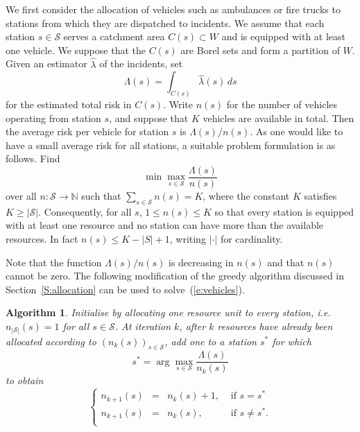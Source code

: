 \documentclass[twoside,11pt]{article}
\newtheorem{algorithm}{Algorithm}[section]
\begin{document}
We first consider the allocation of vehicles such as ambulances or
fire trucks to stations from which they are dispatched to incidents. We 
assume that each station $s \in \mathcal{S}$ serves a catchment area 
$C(s) \subset W$ and is equipped with at least one vehicle.
We suppose that the $C(s)$ are Borel sets and form a partition 
of $W$. Given an estimator $\widehat \lambda$ of the incidents, set
\[
\Lambda(s) = \int_{C(s)} \widehat \lambda(s) \, ds
\]
for the estimated total risk in $C(s)$. Write $n(s)$ for the number 
of vehicles operating from station $s$, and suppose that $K$ vehicles 
are available in total. Then the average risk per vehicle for station 
$s$ is ${\Lambda(s)}/{n(s)}$. As one would like to have a small average 
risk for all stations, a suitable problem formulation is as follows. Find 
\begin{equation}
\min\max_{s \in \mathcal{S}} \frac{\Lambda(s)}{n(s)}
\label{e:vehicles}
\end{equation}over all $n: \mathcal{S} \to \mathbb{N}$ such that 
$\sum_{s\in\mathcal{S}} n(s) = K$, where the constant
$K$ satisfies $K \geq |\mathcal{S}|$.  Consequently, for all $s$,
$1\leq n(s) \leq K$ so that every station is equipped with
at least one resource and no station can have more than the
available resources. In fact $n(s) \leq K - |S| + 1$, writing
$|\cdot|$ for cardinality.

Note that the function $\Lambda(s)/n(s)$ is decreasing in
$n(s)$ and that $n(s)$ cannot be zero. The following modification
of the greedy algorithm discussed in Section~\ref{S:allocation} 
can be used to solve~(\ref{e:vehicles}).

\begin{algorithm}
Initialise by allocating one resource unit to every station,
i.e. $n_{|\mathcal{S}|}(s) = 1$ for all $s\in \mathcal{S}$.
At iteration $k$, after $k$ resources have already been 
allocated according to $(n_k(s))_{s\in\mathcal{S}}$, 
add one to a station $s^*$ for which 
\[
s^* = \arg\max_{s\in \mathcal{S}} \frac{\Lambda(s)}{n_k(s)}
\]
to obtain 
\[
\left\{ 
\begin{array}{llll}
    n_{k+1}(s) & = & n_k(s) + 1, & \mbox{ if } s = s^* \\
    n_{k+1}(s) & = & n_k(s), & \mbox{ if } s\neq s^*. \\
\end{array} 
\right.
\]
\label{A:pumper}
\end{algorithm}
\end{document}
